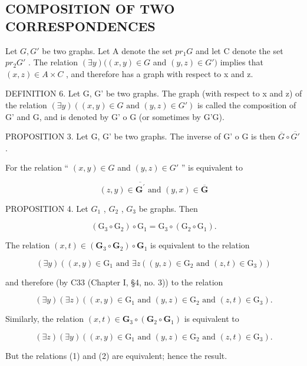 \subsection{COMPOSITION OF TWO CORRESPONDENCES}

Let \(G, G'\) be two graphs. Let A denote the set \(pr_1G\) and let C denote the set \(pr_2G'\) . The relation \((\exists y)((x, y) \in G\) and \((y, z) \in G')\) implies that \((x, z) \in A \times C\) , and therefore has a graph with respect to x and z.

DEFINITION 6. Let G, G' be two graphs. The graph (with respect to x and z) of the relation \((\exists y)((x, y) \in G \text{ and } (y, z) \in G')\) is called the composition of G' and G, and is denoted by G' o G (or sometimes by G'G).

PROPOSITION 3. Let G, G' be two graphs. The inverse of G' o G is then \(\overline{G} \circ \overline{G'}\) .

For the relation `` \((x, y) \in G\) and \((y, z) \in G'\) '' is equivalent to

\[
(z, y) \in \overline {{\mathbf {G} ^ {\prime}}} \text {   and   } (y, x) \in \overline {{\mathbf {G}}}
\]

PROPOSITION 4. Let \(G_{1}\) , \(G_{2}\) , \(G_{3}\) be graphs. Then

\[
\left(\mathrm{G} _ {3} \circ \mathrm{G} _ {2}\right) \circ \mathrm{G} _ {1} = \mathrm{G} _ {3} \circ \left(\mathrm{G} _ {2} \circ \mathrm{G} _ {1}\right).
\]

The relation \((x, t) \in (\mathbf{G}_3 \circ \mathbf{G}_2) \circ \mathbf{G}_1\) is equivalent to the relation

\[
(\exists y) ((x, y) \in \mathrm{G} _ {1} \text {   and   } \exists z ((y, z) \in \mathrm{G} _ {2} \text {   and   } (z, t) \in \mathrm{G} _ {3}))
\]

and therefore (by C33 (Chapter I, §4, no. 3)) to the relation

\[
(\exists y) (\exists z) ((x, y) \in \mathrm{G} _ {1} \text {   and   } (y, z) \in \mathrm{G} _ {2} \text {   and   } (z, t) \in \mathrm{G} _ {3}).\tag{1}
\]

Similarly, the relation \((x, t) \in \mathbf{G}_3 \circ (\mathbf{G}_2 \circ \mathbf{G}_1)\) is equivalent to

\[
(\exists z) (\exists y) ((x, y) \in \mathrm{G} _ {1} \text {   and   } (y, z) \in \mathrm{G} _ {2} \text {   and   } (z, t) \in \mathrm{G} _ {3}).\tag{2}
\]

But the relations (1) and (2) are equivalent; hence the result.


